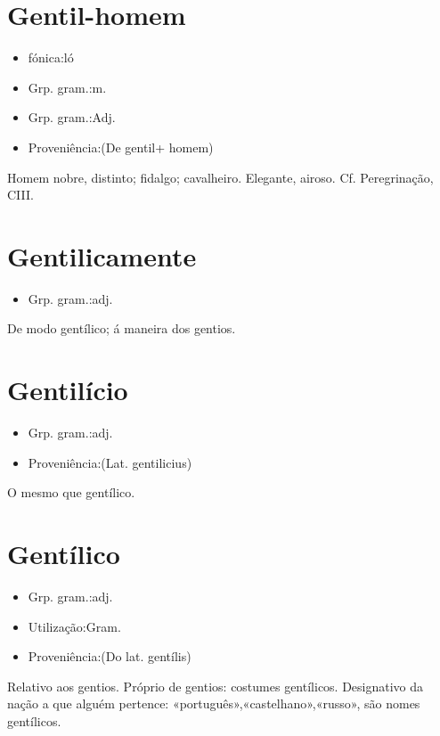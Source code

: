 \section{Gentil-homem}
\begin{itemize}
\item {fónica:ló}
\end{itemize}
\begin{itemize}
\item {Grp. gram.:m.}
\end{itemize}
\begin{itemize}
\item {Grp. gram.:Adj.}
\end{itemize}
\begin{itemize}
\item {Proveniência:(De \textunderscore gentil\textunderscore  + \textunderscore homem\textunderscore )}
\end{itemize}
Homem nobre, distinto; fidalgo; cavalheiro.
Elegante, airoso. Cf. \textunderscore Peregrinação\textunderscore , CIII.
\section{Gentilicamente}
\begin{itemize}
\item {Grp. gram.:adj.}
\end{itemize}
De modo gentílico; á maneira dos gentios.
\section{Gentilício}
\begin{itemize}
\item {Grp. gram.:adj.}
\end{itemize}
\begin{itemize}
\item {Proveniência:(Lat. \textunderscore gentilicius\textunderscore )}
\end{itemize}
O mesmo que \textunderscore gentílico\textunderscore .
\section{Gentílico}
\begin{itemize}
\item {Grp. gram.:adj.}
\end{itemize}
\begin{itemize}
\item {Utilização:Gram.}
\end{itemize}
\begin{itemize}
\item {Proveniência:(Do lat. \textunderscore gentílis\textunderscore )}
\end{itemize}
Relativo aos gentios.
Próprio de gentios: \textunderscore costumes gentílicos\textunderscore .
Designativo da nação a que alguém pertence: \textunderscore «português»,«castelhano»,«russo», são nomes gentílicos\textunderscore .
